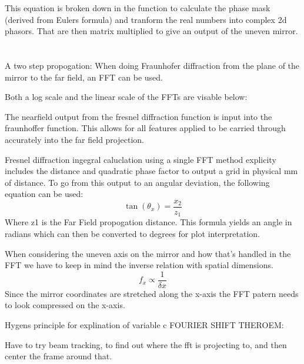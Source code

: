 \documentclass[twoside]{article}
\begin{document}
This equation is broken down in the function to calculate the phase mask (derived from Eulers formula) and tranform the real numbers into complex 2d phasors. That are then matrix multiplied to give an output of the uneven mirror. 


\section*{} A two step propogation:
When doing Fraunhofer diffraction from the plane of the mirror to the far field, an FFT can be used. 

Both a log scale and the linear scale of the FFTs are visable below:


The nearfield output from the fresnel diffraction function is input into the fraunhoffer function. 
This allows for all features applied to be carried through accurately into the far field projection. 

Fresnel diffraction ingegral caluclation using a single FFT method explicity includes the distance and quadratic phase factor to output a grid in physical mm of distance. 
To go from this output to an angular deviation, the following equation can be used:
 \begin{equation*}
    \tan(\theta_x) = \frac{x_2}{z_1}
\end{equation*}
Where z1 is the Far Field propogation distance. This formula yields an angle in radians which can then be converted to degrees for plot interpretation.

When considering the uneven axis on the mirror and how that's handled in the FFT we have to keep in mind the inverse relation with spatial dimensions.
 \begin{equation*}
    f_x \propto \frac{1}{\delta x} 
\end{equation*}
Since the mirror coordinates are stretched along the x-axis the FFT patern needs to look compressed on the x-axis.

Hygens principle for explination of variable c 
FOURIER SHIFT THEROEM:

Have to try beam tracking, to find out where the fft is projecting to, and then center the frame around that.
\end{document}
